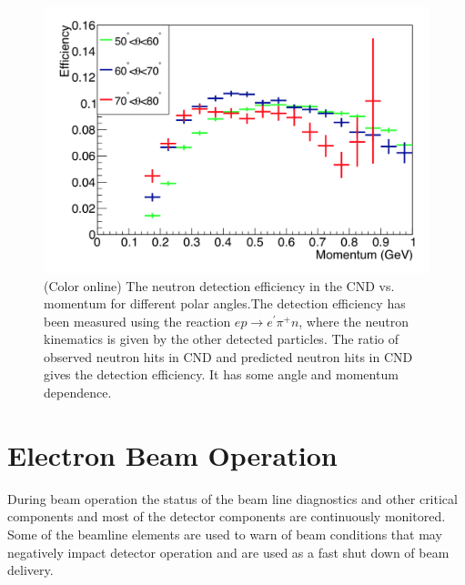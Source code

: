 \documentclass[final,3p,twocolumn]{elsarticle}
\begin{document}
\begin{figure}[htbp!]
\centerline{\includegraphics[width=0.9\columnwidth]{cnd-neutron-efficiency.png}}
\caption{(Color online) The neutron detection efficiency in the CND vs. momentum for different polar angles.The  detection efficiency 
has been measured using the reaction $e p \to e^\prime \pi^+ n$, where the neutron kinematics is given by the other 
detected particles. The ratio of observed neutron hits in CND and predicted neutron hits in CND gives the detection efficiency. It 
has some angle and momentum dependence.  } 
\label{CND-neutron-efficiency}
\end{figure} 

\section{Electron Beam Operation} 
During beam operation the status of the beam line diagnostics and other critical components and most of the 
detector components are continuously monitored. Some of the beamline elements are used to warn of beam 
conditions that may negatively impact detector operation and are used as a fast shut down of beam delivery.    
\end{document}
